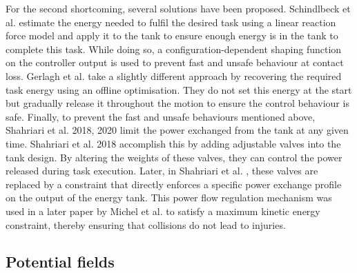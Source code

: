 For the second shortcoming, several solutions have been proposed. Schindlbeck et al. \cite{schindlbeckUnifiedPassivitybasedCartesian2015} estimate the energy needed to fulfil the desired task using a linear reaction force model and apply it to the tank to ensure enough energy is in the tank to complete this task. While doing so, a configuration-dependent shaping function on the controller output is used to prevent fast and unsafe behaviour at contact loss. Gerlagh et al. \cite{gerlaghEnergyawareAdaptiveImpedance2021} take a slightly different approach by recovering the required task energy using an offline optimisation. They do not set this energy at the start but gradually release it throughout the motion to ensure the control behaviour is safe. Finally, to prevent the fast and unsafe behaviours mentioned above, Shahriari et al. 2018, 2020 \cite{shahriariValvebasedVirtualEnergy2018,shahriariPowerFlowRegulation2020} limit the power exchanged from the tank at any given time. Shahriari et al. 2018 \cite{shahriariValvebasedVirtualEnergy2018} accomplish this by adding adjustable valves into the tank design. By altering the weights of these valves, they can control the power released during task execution. Later, in Shahriari et al. \cite{shahriariPowerFlowRegulation2020}, these valves are replaced by a constraint that directly enforces a specific power exchange profile on the output of the energy tank. This power flow regulation mechanism was used in a later paper by Michel et al. \cite{michelSafetyAwareHierarchicalPassivityBased2022} to satisfy a maximum kinetic energy constraint, thereby ensuring that collisions do not lead to injuries.

\subsection{Potential fields}

